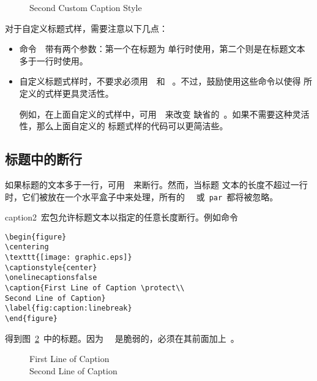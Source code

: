 \begin{figure} 
	\centering 
	\resizebox{2in}{!}{\usebox{\graphic}}
	\caption{Second Custom Caption Style}\label{fig:caption-2} 
\end{figure}

对于自定义标题式样，需要注意以下几点：
\begin{itemize}
	\item 命令~~带有两个参数：第一个在标题为
	单行时使用，第二个则是在标题文本多于一行时使用。
	\item 自定义标题式样时，不要求必须用~~和
	~。不过，鼓励使用这些命令以使得
	所定义的式样更具灵活性。
	
	例如，在上面自定义的式样中，可用~~来改变
	缺省的~。如果不需要这种灵活性，那么上面自定义的
	标题式样的代码可以更简洁些。
\end{itemize}

\subsection{标题中的断行}

如果标题的文本多于一行，可用~~来断行。然而，当标题
文本的长度不超过一行时，它们被放在一个水平盒子中来处理，所有的
~\texttt{\bs\bs}~或~\texttt{\bs par}~都将被忽略。

\textsf{caption2}~宏包允许标题文本以指定的任意长度断行。例如命令
\begin{Verbatim}[xleftmargin=1cm]
\begin{figure} 
\centering 
\texttt{[image: graphic.eps]} 
\captionstyle{center} 
\onelinecaptionsfalse 
\caption{First Line of Caption \protect\\ 
Second Line of Caption} 
\label{fig:caption:linebreak} 
\end{figure}
\end{Verbatim}
得到图~\ref{fig:caption:linebreak}~中的标题。因为~\texttt{\bs\bs}~
是脆弱的，必须在其前面加上~。

\begin{figure}
	\centering
	\resizebox{2in}{!}{\usebox{\graphic}}
	\onelinecaptionsfalse
	\caption{First Line of Caption \protect\\ 
		Second Line of Caption}
	\label{fig:caption:linebreak}
\end{figure}

